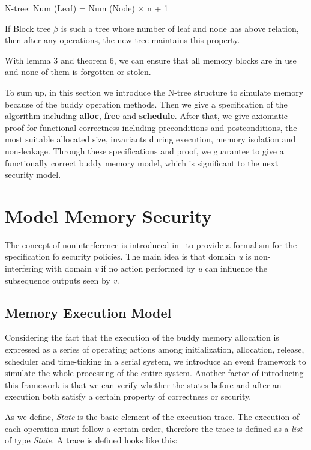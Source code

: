 \documentclass[runningheads]{llncs}
\begin{document}
\begin{lemma}
N-tree: Num (Leaf) = Num (Node) $\times$ n + 1
\end{lemma}

\begin{theorem}
If Block tree $\beta$ is such a tree whose number of leaf and node has above relation, then after any operations, the new tree maintains this property.
\end{theorem}

With lemma 3 and theorem 6, we can ensure that all memory blocks are in use and none of them is forgotten or stolen.

To sum up, in this section we introduce the N-tree structure to simulate memory because of the buddy operation methods. Then we give a specification of the algorithm including \textbf{alloc}, \textbf{free} and \textbf{schedule}. After that, we give axiomatic proof for functional correctness including preconditions and postconditions, the most suitable allocated size, invariants during execution, memory isolation and non-leakage. Through these specifications and proof, we guarantee to give a functionally correct buddy memory model, which is significant to the next security model.


\section{Model Memory Security}
The concept of noninterference is introduced in~\cite{reg_noninterference} to provide a formalism for the specification fo security policies. The main idea is that domain \textsl{u} is non-interfering with domain \textsl{v} if no action performed by \textsl{u} can influence the subsequence outputs seen by \textsl{v}.

\subsection{Memory Execution Model}
Considering the fact that the execution of the buddy memory allocation is expressed as a series of operating actions among initialization, allocation, release, scheduler and time-ticking in a serial system, we introduce an event framework to simulate the whole processing of the entire system. Another factor of introducing this framework is that we can verify whether the states before and after an execution both satisfy a certain property of correctness or security.

As we define, \textsl{State} is the basic element of the execution trace. The execution of each operation must follow a certain order, therefore the trace is defined as a \textsl{list} of type \textsl{State}. A trace is defined looks like this:
\end{document}
